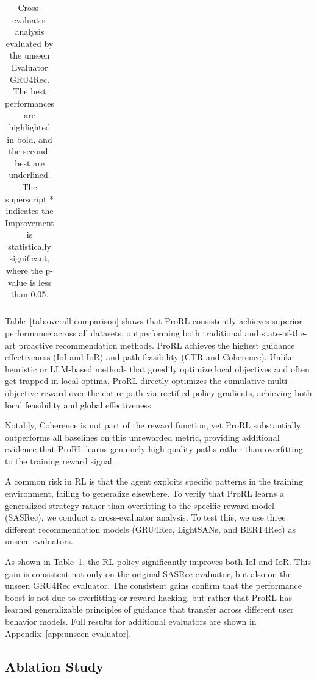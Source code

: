 \documentclass{llmxive}
\begin{document}
\begin{table}[t]
{\begin{tabular}{c c cccc cccc cccc}
      \bottomrule[1.5pt]
      \end{tabular}
      }
\caption{Cross-evaluator analysis evaluated by the unseen Evaluator GRU4Rec. The best performances are highlighted in bold, and the second-best are underlined. The superscript * indicates the Improvement is statistically significant, where the p-value is less than 0.05.}
\label{tab:gru4rec evaluator}
\end{table}

Table~\ref{tab:overall comparison} shows that ProRL consistently achieves superior performance across all datasets, outperforming both traditional and state-of-the-art proactive recommendation methods. ProRL achieves the highest guidance effectiveness (IoI and IoR) and path feasibility (CTR and Coherence). Unlike heuristic or LLM-based methods that greedily optimize local objectives and often get trapped in local optima, ProRL directly optimizes the cumulative multi-objective reward over the entire path via rectified policy gradients, achieving both local feasibility and global effectiveness.

Notably, Coherence is not part of the reward function, yet ProRL substantially outperforms all baselines on this unrewarded metric, providing additional evidence that ProRL learns genuinely high-quality paths rather than overfitting to the training reward signal.


A common risk in RL is that the agent exploits specific patterns in the training environment, failing to generalize elsewhere. To verify that ProRL learns a generalized strategy rather than overfitting to the specific reward model (SASRec), we conduct a cross-evaluator analysis. To test this, we use three different recommendation models (GRU4Rec, LightSANs, and BERT4Rec) as unseen evaluators.

As shown in Table~\ref{tab:gru4rec evaluator}, the RL policy significantly improves both IoI and IoR. This gain is consistent not only on the original SASRec evaluator, but also on the unseen GRU4Rec evaluator. The consistent gains confirm that the performance boost is not due to overfitting or reward hacking, but rather that ProRL has learned generalizable principles of guidance that transfer across different user behavior models. Full results for additional evaluators are shown in Appendix~\ref{app:unseen evaluator}.


\subsection{Ablation Study}
\end{document}
